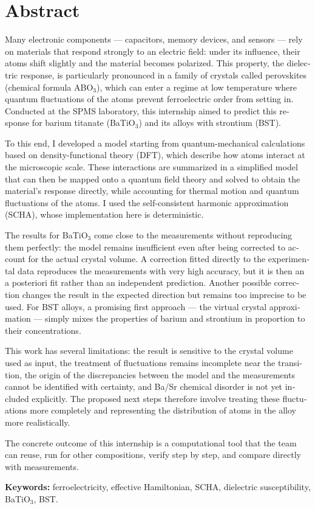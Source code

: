 \documentclass{rapportCS}
\begin{document}
\section*{Abstract}
\begin{otherlanguage}{english}

Many electronic components --- capacitors, memory devices, and sensors --- rely
on materials that respond strongly to an electric field: under its influence,
their atoms shift slightly and the material becomes polarized. This property,
the dielectric response, is particularly pronounced in a family of crystals
called perovskites (chemical formula ABO$_3$), which can enter a regime at low
temperature where quantum fluctuations of the atoms prevent ferroelectric
order from setting in. Conducted at the SPMS laboratory, this internship aimed
to predict this response for barium titanate (BaTiO$_3$) and its alloys with
strontium (BST).

To this end, I developed a model starting from quantum-mechanical calculations
based on density-functional theory (DFT), which describe how atoms interact at
the microscopic scale. These interactions are summarized in a simplified model that
can then be mapped onto a quantum field theory and solved to obtain the
material's response directly, while accounting for thermal motion and quantum
fluctuations of the atoms. I used the self-consistent harmonic approximation
(SCHA), whose implementation here is deterministic.

The results for BaTiO$_3$ come close to the measurements without reproducing them
perfectly: the model remains insufficient even after being corrected to account
for the actual crystal volume. A correction fitted directly to the experimental
data reproduces the measurements with very high accuracy, but it is then an
a posteriori fit rather than an independent prediction. Another possible
correction changes the result in the expected direction but remains too
imprecise to be used. For BST alloys, a promising first approach --- the
virtual crystal approximation --- simply mixes the properties of barium
and strontium in proportion to their concentrations.

This work has several limitations: the result is sensitive to the crystal
volume used as input, the treatment of fluctuations remains incomplete near the
transition, the origin of the discrepancies between the model and the
measurements cannot be identified with certainty, and Ba/Sr chemical disorder is not yet
included explicitly. The proposed next steps therefore involve treating these
fluctuations more completely and representing the distribution of atoms in the
alloy more realistically.

The concrete outcome of this internship is a computational tool that the team
can reuse, run for other compositions, verify step by step, and compare directly
with measurements.

\noindent\textbf{Keywords:} ferroelectricity, effective Hamiltonian, SCHA,
dielectric susceptibility, BaTiO$_3$, BST.
\end{otherlanguage}
\end{document}
